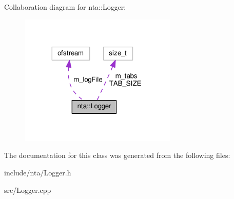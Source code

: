 Collaboration diagram for nta\+:\+:Logger\+:
\nopagebreak
\begin{figure}[H]
\begin{center}
\leavevmode
\includegraphics[width=212pt]{d4/d22/classnta_1_1Logger__coll__graph}
\end{center}
\end{figure}


The documentation for this class was generated from the following files\+:\begin{DoxyCompactItemize}
\item 
include/nta/Logger.\+h\item 
src/Logger.\+cpp\end{DoxyCompactItemize}
